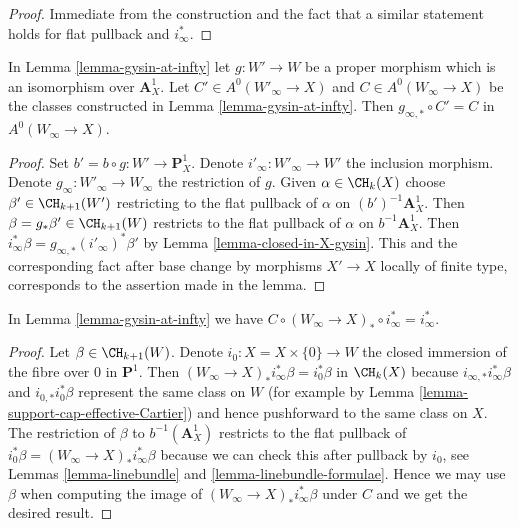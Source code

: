 \begin{proof}
Immediate from the construction and the fact that a similar
statement holds for flat pullback and $i_\infty^*$.
\end{proof}

\begin{lemma}
\label{lemma-gysin-at-infty-independent}
In Lemma \ref{lemma-gysin-at-infty} let $g : W' \to W$ be a proper morphism
which is an isomorphism over $\mathbf{A}^1_X$. Let
$C' \in A^0(W'_\infty \to X)$ and $C \in A^0(W_\infty \to X)$
be the classes constructed in Lemma \ref{lemma-gysin-at-infty}.
Then $g_{\infty, *} \circ C' = C$ in $A^0(W_\infty \to X)$.
\end{lemma}

\begin{proof}
Set $b' = b \circ g : W' \to \mathbf{P}^1_X$. Denote
$i'_\infty : W'_\infty \to W'$ the inclusion morphism.
Denote $g_\infty : W'_\infty \to W_\infty$ the restriction of $g$.
Given $\alpha \in \CH_k(X)$ choose $\beta' \in \CH_{k + 1}(W')$
restricting to the flat pullback of $\alpha$ on $(b')^{-1}\mathbf{A}^1_X$.
Then $\beta = g_*\beta' \in \CH_{k + 1}(W)$ restricts to the
flat pullback of $\alpha$ on $b^{-1}\mathbf{A}^1_X$.
Then $i_\infty^*\beta = g_{\infty, *}(i'_\infty)^*\beta'$
by Lemma \ref{lemma-closed-in-X-gysin}.
This and the corresponding fact after base change by
morphisms $X' \to X$ locally of finite type, corresponds
to the assertion made in the lemma.
\end{proof}

\begin{lemma}
\label{lemma-homomorphism-pre}
In Lemma \ref{lemma-gysin-at-infty} we have
$C \circ (W_\infty \to X)_* \circ i_\infty^* = i_\infty^*$.
\end{lemma}

\begin{proof}
Let $\beta \in \CH_{k + 1}(W)$. Denote $i_0 : X = X \times \{0\} \to W$
the closed immersion of the fibre over $0$ in $\mathbf{P}^1$. Then
$(W_\infty \to X)_* i_\infty^* \beta = i_0^*\beta$ in $\CH_k(X)$ because
$i_{\infty, *}i_\infty^*\beta$ and $i_{0, *}i_0^*\beta$
represent the same class on $W$ (for example by
Lemma \ref{lemma-support-cap-effective-Cartier})
and hence pushforward to the same class on $X$.
The restriction of $\beta$ to $b^{-1}(\mathbf{A}^1_X)$
restricts to the flat pullback of
$i_0^*\beta = (W_\infty \to X)_* i_\infty^* \beta$ because we can check
this after pullback by $i_0$, see
Lemmas \ref{lemma-linebundle} and \ref{lemma-linebundle-formulae}.
Hence we may use $\beta$ when computing the image of
$(W_\infty \to X)_*i_\infty^*\beta$ under $C$
and we get the desired result.
\end{proof}

